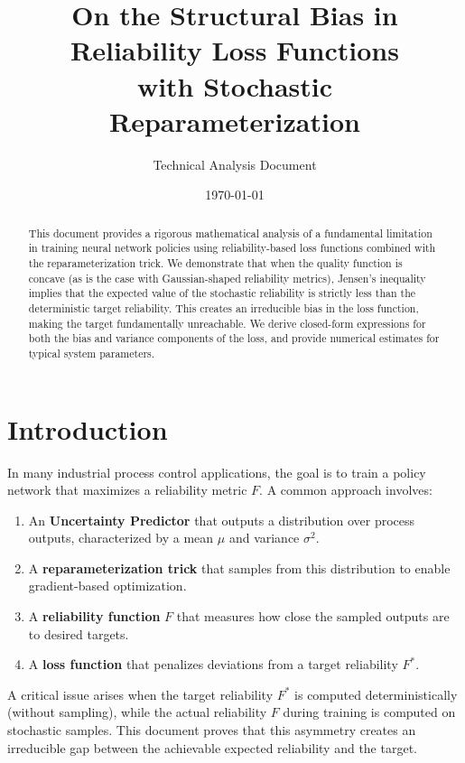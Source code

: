 \documentclass[11pt,a4paper]{article}
\title{On the Structural Bias in Reliability Loss Functions\\with Stochastic Reparameterization}
\author{Technical Analysis Document}
\date{\today}
\theoremstyle{definition}
\begin{document}
\maketitle

\begin{abstract}
This document provides a rigorous mathematical analysis of a fundamental limitation in training neural network policies using reliability-based loss functions combined with the reparameterization trick. We demonstrate that when the quality function is concave (as is the case with Gaussian-shaped reliability metrics), Jensen's inequality implies that the expected value of the stochastic reliability is strictly less than the deterministic target reliability. This creates an irreducible bias in the loss function, making the target fundamentally unreachable. We derive closed-form expressions for both the bias and variance components of the loss, and provide numerical estimates for typical system parameters.
\end{abstract}

\tableofcontents
\newpage

\section{Introduction}

In many industrial process control applications, the goal is to train a policy network that maximizes a reliability metric $F$. A common approach involves:

\begin{enumerate}
    \item An \textbf{Uncertainty Predictor} that outputs a distribution over process outputs, characterized by a mean $\mu$ and variance $\sigma^2$.
    \item A \textbf{reparameterization trick} that samples from this distribution to enable gradient-based optimization.
    \item A \textbf{reliability function} $F$ that measures how close the sampled outputs are to desired targets.
    \item A \textbf{loss function} that penalizes deviations from a target reliability $F^*$.
\end{enumerate}

A critical issue arises when the target reliability $F^*$ is computed deterministically (without sampling), while the actual reliability $F$ during training is computed on stochastic samples. This document proves that this asymmetry creates an irreducible gap between the achievable expected reliability and the target.
\end{document}
